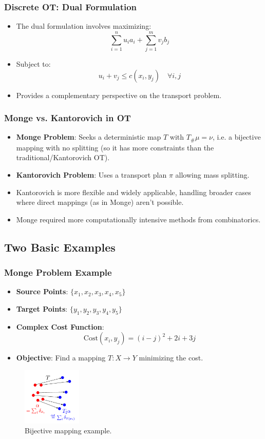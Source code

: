 \documentclass{beamer}
\begin{document}
	\begin{frame}
		\frametitle{Discrete OT: Dual Formulation}
		\begin{itemize}
			\item The dual formulation involves maximizing:
			\[
			\sum_{i=1}^n u_i a_i + \sum_{j=1}^m v_j b_j
			\]
			\item Subject to:
			\[
			u_i + v_j \leq c(x_i, y_j) \quad \forall i, j
			\]
			\item Provides a complementary perspective on the transport problem.
		\end{itemize}
	\end{frame}
	
	\begin{frame}
		\frametitle{Monge vs. Kantorovich in OT}
		\begin{itemize}
			\item \textbf{Monge Problem}: Seeks a deterministic map \(T\) with \(T_\# \mu = \nu\), i.e. a bijective mapping with no splitting (so it has more constraints than the traditional/Kantorovich OT).
			\item \textbf{Kantorovich Problem}: Uses a transport plan \(\pi\) allowing mass splitting.
			\item Kantorovich is more flexible and widely applicable, handling broader cases where direct mappings (as in Monge) aren't possible.
			\item Monge required more computationally intensive methods from combinatorics.
		\end{itemize}
	\end{frame}
	
	\subsection{Two Basic Examples}
		
		\begin{frame}
			\frametitle{Monge Problem Example}
			\begin{itemize}
				\item \textbf{Source Points}: \( \{x_1, x_2, x_3, x_4, x_5\} \)
				\item \textbf{Target Points}: \( \{y_1, y_2, y_3, y_4, y_5\} \)
				\item \textbf{Complex Cost Function}:
				\[
				\text{Cost}(x_i, y_j) = (i - j)^2 + 2i + 3j
				\]
				\item \textbf{Objective}: Find a mapping \(T: X \to Y\) minimizing the cost.
			\end{itemize}
			\begin{figure}
				\includegraphics[width=0.25\textwidth]{monge.png}
				\caption{Bijective mapping example. \cite{peyre2019computational}}
			\end{figure}
		\end{frame}
		
\end{document}
